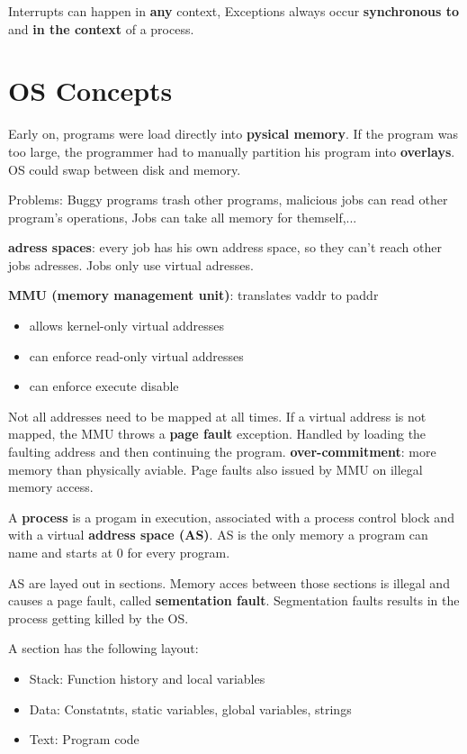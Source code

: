 \documentclass[11pt,a4paper]{article}
\begin{document}
	Interrupts can happen in \textbf{any} context, Exceptions always occur \textbf{synchronous to} and \textbf{in the context} of a process.
	
	\section{OS Concepts}
	
	Early on, programs were load directly into \textbf{pysical memory}. If the program was too large, the  programmer had to manually partition his program into \textbf{overlays}. OS could swap between disk and memory.
	
	Problems: Buggy programs trash other programs, malicious jobs can read other program's operations, Jobs can take all memory for themself,...
	
	\textbf{adress spaces}: every job has his own address space, so they can't reach other jobs adresses. Jobs only use virtual adresses. \newline
	
	\textbf{MMU (memory management unit)}: translates \gls{vaddr} to \gls{paddr}
	
	\begin{itemize}
		\item allows kernel-only virtual addresses
		\item can enforce read-only virtual addresses
		\item can enforce execute disable
	\end{itemize}
	
	Not all addresses need to be mapped at all times. If a virtual address is not mapped, the MMU throws a \textbf{page fault} exception. Handled by loading the faulting address and then continuing the program. \textbf{over-commitment}: more memory than physically aviable. Page faults also issued by MMU on illegal memory access.
	
	A \textbf{process} is a progam in execution, associated with a \gls{process control block} and with a virtual \textbf{address space (AS)}. AS is the only memory a program can name and starts at 0 for every program.
	
	AS are layed out in sections. Memory acces between those sections is illegal and causes a page fault, called \textbf{sementation fault}. Segmentation faults results in the process getting killed by the OS.
	
	A section has the following layout:
	\begin{itemize}
		\item Stack: Function history and local variables
		\item Data: Constatnts, static variables, global variables, strings
		\item Text: Program code
	\end{itemize}
	
\end{document}
